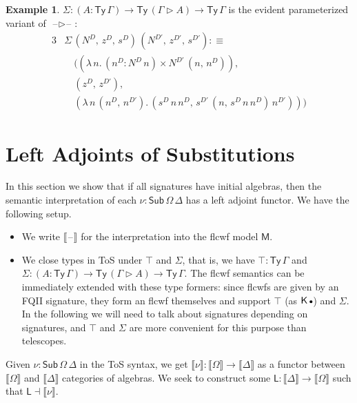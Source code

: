 \documentclass[12pt,a4paper,twoside,openany]{book}
\theoremstyle{remark}
\theoremstyle{definition}
\newtheorem{myexample}{Example}
\theoremstyle{theorem}
\newcommand{\ms}[1]{\mathsf{#1}}
\newcommand{\bs}[1]{\boldsymbol{#1}}
\newcommand{\Sub}{\mathsf{Sub}}
\newcommand{\Ty}{\mathsf{Ty}}
\newcommand{\blank}{\mathord{\hspace{1pt}\text{--}\hspace{1pt}}}
\newcommand{\ext}{\triangleright}
\newcommand{\emptycon}{\scaleobj{.75}\bullet}
\newcommand{\K}{\mathsf{K}}
\newcommand{\bM}{\bs{\mathsf{M}}}
\newcommand{\llb}{\llbracket}
\newcommand{\rrb}{\rrbracket}
\newcommand{\sem}[1]{\llb#1\rrb}
\newcommand{\defn}{:\equiv}
\begin{document}
\begin{myexample}
$\Sigma : (A : \Ty\,\Gamma) \to \Ty\,(\Gamma \ext A) \to \Ty\,\Gamma$ is the
evident parameterized variant of $\blank\ext\blank$:
\begin{alignat*}{3}
  &\Sigma\,(N^D,\,z^D,\,s^D)\,(N^{D'},\,z^{D'},\,s^{D'}) \defn\\
  & \hspace{1em}((\lambda\,n.\,(n^D : N^D\,n) \times N^{D'}\,(n,\,n^D)),\,\\
  & \hspace{1em}(z^D,\,z^{D'}),\,\\
  & \hspace{1em}(\lambda\,n\,(n^D,\,n^{D'}).\,(s^D\,n\,n^D,\,s^{D'}\,(n,\,s^D\,n\,n^D)\,n^{D'})))
\end{alignat*}
\end{myexample}

\section{Left Adjoints of Substitutions}
\label{sec:fqii-left-adjoint}

In this section we show that if all signatures have initial algebras, then the
semantic interpretation of each $\nu : \Sub\,\Omega\,\Delta$ has a left adjoint
functor. We have the following setup.
\begin{itemize}
  \item
  We write $\llb\blank\rrb$ for the interpretation into the flcwf model $\bM$.
  \item
  We close types in ToS under $\top$ and $\Sigma$, that is, we have $\top :
  \Ty\,\Gamma$ and $\Sigma : (A : \Ty\,\Gamma) \to \Ty\,(\Gamma \ext A) \to
  \Ty\,\Gamma$. The flcwf semantics can be immediately extended with these type
  formers: since flcwfs are given by an FQII signature, they form an flcwf
  themselves and support $\top$ (as $\K\,\emptycon$) and $\Sigma$. In the
  following we will need to talk about signatures depending on signatures, and
  $\top$ and $\Sigma$ are more convenient for this purpose than telescopes.
\end{itemize}

Given $\nu : \Sub\,\Omega\,\Delta$ in the ToS syntax, we get $\sem{\nu} :
\sem{\Omega} \to \sem{\Delta}$ as a functor between $\sem{\Omega}$ and
$\sem{\Delta}$ categories of algebras. We seek to construct some $\ms{L} :
\sem{\Delta} \to \sem{\Omega}$ such that $\ms{L} \dashv \sem{\nu}$.
\end{document}
